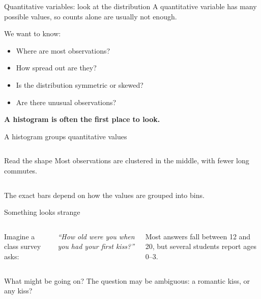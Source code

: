 \documentclass[11pt,aspectratio=169]{beamer}
\newcommand{\bigquestion}[1]{%
\begin{center}
\begin{minipage}{0.88\textwidth}
\centering
\Large\color{LBJnavy}\textbf{#1}
\end{minipage}
\end{center}}
\begin{document}
\begin{frame}{Quantitative variables: look at the distribution}
A quantitative variable has many possible values, so counts alone are usually not enough.

\vspace{0.6em}
We want to know:
\begin{itemize}
  \item Where are most observations?
  \item How spread out are they?
  \item Is the distribution symmetric or skewed?
  \item Are there unusual observations?
\end{itemize}
\vfill
\bigquestion{A histogram is often the first place to look.}
\end{frame}

\begin{frame}{A histogram groups quantitative values}
\begin{columns}[c,onlytextwidth]
\centering
{}
\begin{block}{Read the shape}
Most observations are clustered in the middle, with fewer long commutes.
\end{block}
\end{columns}
\vfill
\alert{The exact bars depend on how the values are grouped into bins.}
\end{frame}

\begin{frame}{Something looks strange}
\begin{columns}[c,onlytextwidth]
Imagine a class survey asks:

\vspace{0.5em}
\begin{center}
\textit{``How old were you when you had your first kiss?''}
\end{center}

Most answers fall between 12 and 20, but several students report ages 0--3.
\centering
{}
\end{columns}
\vfill
\begin{alertblock}{What might be going on?} \pause
The question may be ambiguous: a romantic kiss, or any kiss?
\end{alertblock}
\end{frame}
\end{document}
